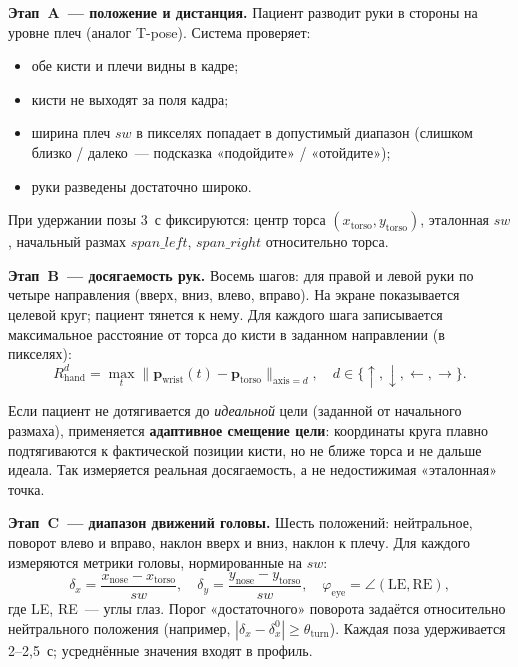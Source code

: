 \textbf{Этап~A~--- положение и дистанция.}
Пациент разводит руки в стороны на уровне плеч (аналог T-pose).
Система проверяет:
\begin{itemize}
    \item обе кисти и плечи видны в кадре;
    \item кисти не выходят за поля кадра;
    \item ширина плеч $sw$ в пикселях попадает в допустимый диапазон
    (слишком близко / далеко~--- подсказка «подойдите» / «отойдите»);
    \item руки разведены достаточно широко.
\end{itemize}
При удержании позы 3~с фиксируются: центр торса $(x_{\mathrm{torso}},
y_{\mathrm{torso}})$, эталонная $sw$, начальный размах
$\mathit{span\_left}$, $\mathit{span\_right}$ относительно торса.

\textbf{Этап~B~--- досягаемость рук.}
Восемь шагов: для правой и левой руки по четыре направления
(вверх, вниз, влево, вправо). На экране показывается целевой круг;
пациент тянется к нему. Для каждого шага записывается максимальное
расстояние от торса до кисти в заданном направлении (в пикселях):
\[
R_{\mathrm{hand}}^{d} = \max_t \bigl\| \mathbf{p}_{\mathrm{wrist}}(t)
- \mathbf{p}_{\mathrm{torso}} \bigr\|_{\mathrm{axis}=d},
\quad d \in \{\uparrow, \downarrow, \leftarrow, \rightarrow\}.
\]

Если пациент не дотягивается до \emph{идеальной} цели (заданной от
начального размаха), применяется \textbf{адаптивное смещение цели}:
координаты круга плавно подтягиваются к фактической позиции кисти,
но не ближе торса и не дальше идеала. Так измеряется реальная
досягаемость, а не недостижимая «эталонная» точка.

\textbf{Этап~C~--- диапазон движений головы.}
Шесть положений: нейтральное, поворот влево и вправо, наклон
вверх и вниз, наклон к плечу. Для каждого измеряются метрики головы,
нормированные на $sw$:
\[
\delta_x = \frac{x_{\mathrm{nose}} - x_{\mathrm{torso}}}{sw}, \quad
\delta_y = \frac{y_{\mathrm{nose}} - y_{\mathrm{torso}}}{sw}, \quad
\varphi_{\mathrm{eye}} = \angle(\mathrm{LE}, \mathrm{RE}),
\]
где LE, RE~--- углы глаз. Порог «достаточного» поворота задаётся
относительно нейтрального положения (например,
$|\delta_x - \delta_x^{0}| \geq \theta_{\mathrm{turn}}$).
Каждая поза удерживается 2--2,5~с; усреднённые значения входят
в профиль.


